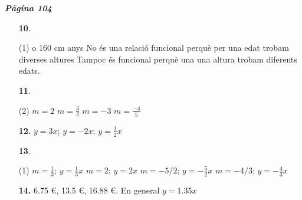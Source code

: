 \documentclass[a4paper, pdf, twoside]{book}
\begin{document}
\begin{multicols}{2}

{\textbf{\em Pàgina 104}} \hrulefill
\begin{enumerate}
\vspace{0.25cm}



 \item[\fontfamily{phv}\selectfont\color{blue}\textbf{10}. ] 
 \begin{tasks}[column-sep=1em, item-indent=1.3333em](1)
	  o 160 cm
	  anys
	 \task* No és una relació funcional perquè per una edat trobam diverses altures
	 \task* Tampoc és funcional perquè una una altura trobam diferents edats.
\end{tasks}
 \end{enumerate}
\begin{enumerate}
\vspace{0.25cm}



 \item[\fontfamily{phv}\selectfont\color{blue}\textbf{11}. ] 
 \begin{tasks}[column-sep=1em, item-indent=1.3333em](2)
	 \task $m=2$
	 \task $m=\frac {3}{2}$
	 \task $m=-3$
	 \task $m=\frac {-4}{5}$
\end{tasks}
\vspace{0.25cm}
\item[\fontfamily{phv}\selectfont\color{blue}\textbf{12. }] 
$y=3x$; $y=-2x$; $y=\frac {1}{2}x$ 
\vspace{0.25cm}



 \item[\fontfamily{phv}\selectfont\color{blue}\textbf{13}. ] 
 \begin{tasks}[column-sep=1em, item-indent=1.3333em](1)
	 \task $m=\frac {1}{3}$; $y=\frac {1}{3}x$
	 \task $m=2$; $y=2x$
	 \task $m=-5/2$; $y=-\frac {5}{2}x$
	 \task $m=-4/3$; $y=-\frac {4}{3}x$
\end{tasks}
\vspace{0.25cm}
\item[\fontfamily{phv}\selectfont\color{blue}\textbf{14. }] 
6.75 \euro {}, 13.5 \euro {}, 16.88 \euro {}. En general $y=1.35 x$
 \end{enumerate}
\vspace{0.3cm}



\end{multicols}
\end{document}
